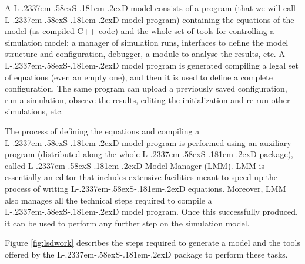 \documentclass [11pt,a4paper] {book}
\def\LsD{{L\kern-.2337em\lower-.58ex\hbox{S}\kern-.181em\lower-.2ex\hbox{D}}\xspace}
\begin{document}
A \LsD model consists of a program (that we will call \LsD model program) containing the equations of the model (as compiled C++ code) and the whole set of tools for controlling a simulation model: a manager of simulation runs, interfaces to define the model structure and configuration, debugger, a module to analyse the results, etc. A \LsD model program is generated compiling a legal set of equations (even an empty one), and then it is used to define a complete configuration. The same program can upload a previously saved configuration, run a simulation, observe the results, editing the initialization and re-run other simulations, etc.

The process of defining the equations and compiling a \LsD model program is performed using an auxiliary program (distributed along the whole \LsD package), called \LsD Model Manager (LMM). LMM is essentially an editor that includes extensive facilities meant to speed up the process of writing \LsD equations. Moreover, LMM also manages all the technical steps required to compile a \LsD model program. Once this successfully produced, it can be used to perform any further step on the simulation model.


Figure \ref{fig:lsdwork} describes the steps required to generate a model and the tools offered by the \LsD package to perform these tasks.
\end{document}
